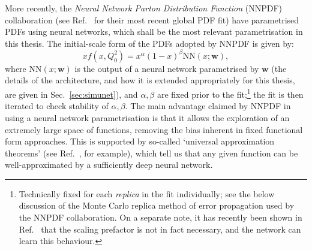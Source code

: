 \documentclass[withindex,glossary]{cam-thesis}
\renewcommand{\vec}[1]{\textbf{#1}} %
\begin{document}
More recently, the \textit{Neural Network Parton Distribution Function} (NNPDF) collaboration (see Ref.~\cite{NNPDF:2021njg} for their most recent global PDF fit) have parametrised PDFs using neural networks, which shall be the most relevant parametrisation in this thesis. The initial-scale form of the PDFs adopted by NNPDF is given by:
\begin{equation}
xf(x,Q_0^2) = x^{\alpha}(1-x)^{\beta} \text{NN}(x; \vec{w}),
\end{equation}
where $\text{NN}(x; \vec{w})$ is the output of a neural network parametrised by $\vec{w}$ (the details of the architecture, and how it is extended appropriately for this thesis, are given in Sec.~\ref{sec:simunet}), and $\alpha, \beta$ are fixed prior to the fit;\footnote{Technically fixed for each \textit{replica} in the fit individually; see the below discussion of the Monte Carlo replica method of error propagation used by the NNPDF collaboration. On a separate note, it has recently been shown in Ref.~\cite{Carrazza:2021yrg} that the scaling prefactor is not in fact necessary, and the network can learn this behaviour.} the fit is then iterated to check stability of $\alpha, \beta$. The main advantage claimed by NNPDF in using a neural network parametrisation is that it allows the exploration of an extremely large space of functions, removing the bias inherent in fixed functional form approaches. This is supported by so-called `universal approximation theorems' (see Ref.~\cite{HORNIK1989359}, for example), which tell us that any given function can be well-approximated by a sufficiently deep neural network.
\end{document}
